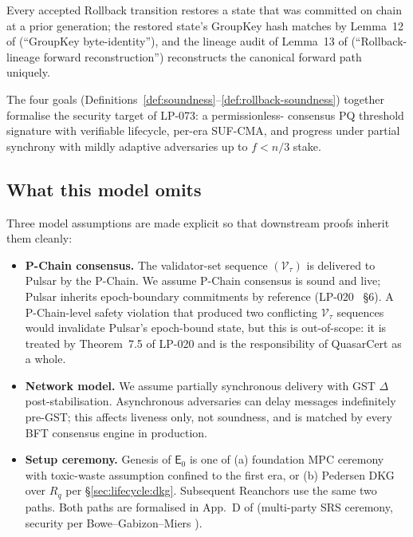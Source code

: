 \begin{definition}
\label{def:rollback-soundness}
Every accepted Rollback transition restores a state that was committed
on chain at a prior generation; the restored state's GroupKey hash
matches by Lemma~12 of \cite{quasarcertsoundness}
(``GroupKey byte-identity''), and the lineage audit of
Lemma~13 of \cite{quasarcertsoundness} (``Rollback-lineage forward
reconstruction'') reconstructs the canonical
forward path uniquely.
\end{definition}

The four goals (Definitions~\ref{def:soundness}--\ref{def:rollback-soundness})
together formalise the security target of LP-073: a permissionless-
consensus PQ threshold signature with verifiable lifecycle, per-era
SUF-CMA, and progress under partial synchrony with mildly adaptive
adversaries up to $f < n/3$ stake.

\subsection{What this model omits}
\label{sec:formal-model:omits}

Three model assumptions are made explicit so that downstream proofs
inherit them cleanly:

\begin{itemize}[nosep]
  \item \textbf{P-Chain consensus.} The validator-set sequence
        $(\mathcal{V}_\tau)$ is delivered to Pulsar by the P-Chain. We
        assume P-Chain consensus is sound and live; Pulsar inherits
        epoch-boundary commitments by reference (LP-020
        \cite{lp020}~\S6). A P-Chain-level safety violation that
        produced two conflicting $\mathcal{V}_\tau$ sequences would
        invalidate Pulsar's epoch-bound state, but this is
        out-of-scope: it is treated by Theorem~7.5 of LP-020 and is
        the responsibility of QuasarCert as a whole.
  \item \textbf{Network model.} We assume partially synchronous
        delivery with GST $\Delta$ post-stabilisation. Asynchronous
        adversaries can delay messages indefinitely pre-GST; this
        affects liveness only, not soundness, and is matched by every
        BFT consensus engine in production.
  \item \textbf{Setup ceremony.} Genesis of $\mathsf{E}_0$ is one of
        (a) foundation MPC ceremony with toxic-waste assumption
        confined to the first era, or (b) Pedersen DKG over $R_q$ per
        \S\ref{sec:lifecycle:dkg}. Subsequent Reanchors use the same
        two paths. Both paths are formalised in App.~D of
        \cite{quasarcertsoundness} (multi-party SRS ceremony, security
        per Bowe--Gabizon--Miers \cite{bowe2017}).
\end{itemize}
